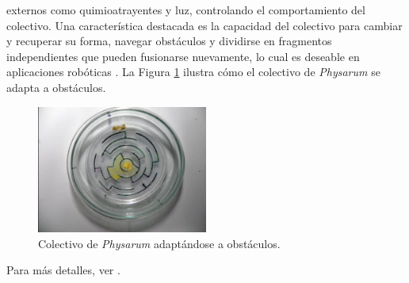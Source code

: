         externos como quimioatrayentes y luz, controlando el comportamiento del colectivo.
    \vskip 0.5cm
    Una caracter\'istica destacada es la capacidad del colectivo para cambiar y recuperar su forma, navegar obst\'aculos 
        y dividirse en fragmentos independientes que pueden fusionarse nuevamente, lo cual es deseable en aplicaciones 
        rob\'oticas \cite{Adamatzky2010}. La Figura \ref{fig:adaptacion_obstaculos} ilustra c\'omo el colectivo de 
        \textit{Physarum} se adapta a obst\'aculos.
    \vskip 0.5cm
    \begin{figure}[h]
        \centering
        \includegraphics[width=0.5\textwidth]{./images/estado_del_arte/physarum/laberinto.png}
        \caption{Colectivo de \textit{Physarum} adapt\'andose a obst\'aculos. \cite{Adamatzky_2012}}
        \label{fig:adaptacion_obstaculos}
    \end{figure}
    \vskip 0.5cm
    Para m\'as detalles, ver \cite{jones2012}.
